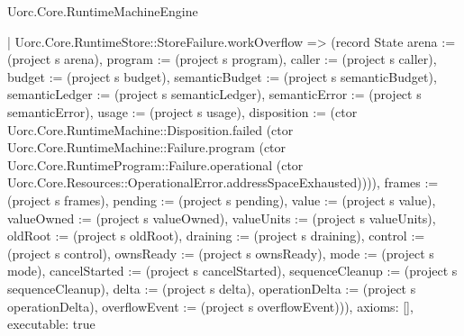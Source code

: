 \begin{lexlean}{Uorc.Core.RuntimeMachineEngine}
\begin{semanticmodule}
{    | Uorc.Core.RuntimeStore::StoreFailure.workOverflow => (record State {arena := (project s arena), program := (project s program), caller := (project s caller), budget := (project s budget), semanticBudget := (project s semanticBudget), semanticLedger := (project s semanticLedger), semanticError := (project s semanticError), usage := (project s usage), disposition := (ctor Uorc.Core.RuntimeMachine::Disposition.failed (ctor Uorc.Core.RuntimeMachine::Failure.program (ctor Uorc.Core.RuntimeProgram::Failure.operational (ctor Uorc.Core.Resources::OperationalError.addressSpaceExhausted)))), frames := (project s frames), pending := (project s pending), value := (project s value), valueOwned := (project s valueOwned), valueUnits := (project s valueUnits), oldRoot := (project s oldRoot), draining := (project s draining), control := (project s control), ownsReady := (project s ownsReady), mode := (project s mode), cancelStarted := (project s cancelStarted), sequenceCleanup := (project s sequenceCleanup), delta := (project s delta), operationDelta := (project s operationDelta), overflowEvent := (project s overflowEvent)})),
  axioms: [],
  executable: true
}


\end{semanticmodule}
\end{lexlean}
